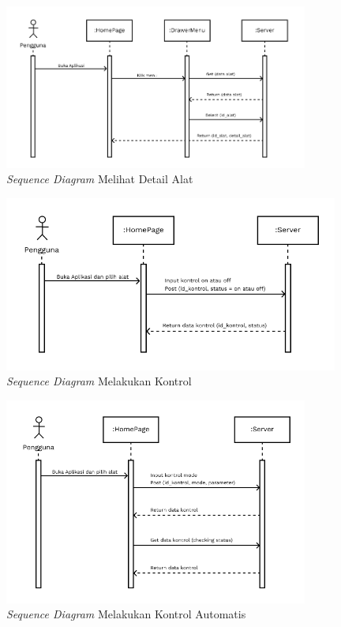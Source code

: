 \begin{flushleft}
\begin{justify}
\begin{enumerate}[label=\alph*.]
\begin{figure}[ht]
                \centering
                \includegraphics[width=10cm]{images/bab 4/Sequence buka detail alat.png}
                \caption{\textit{Sequence Diagram} Melihat Detail Alat}
            \end{figure}

            \begin{figure}[ht]
                \centering
                \includegraphics[width=11cm]{images/bab 4/Sequence kontrol.png}
                \caption{\textit{Sequence Diagram} Melakukan Kontrol}
            \end{figure}
            \vspace{2cm}
            \begin{figure}[ht]
                \centering
                \includegraphics[width=10cm]{images/bab 4/Sequence kontrol Auto.png}
                \caption{\textit{Sequence Diagram} Melakukan Kontrol Automatis}
            \end{figure}
            \end{enumerate}
            \vspace{10cm}

\end{justify}
\end{flushleft}
